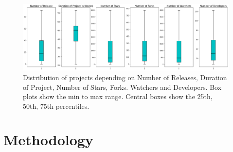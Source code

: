\documentclass[smallextended]{svjour3}
\begin{document}
\begin{figure}[!b]
\includegraphics[width=\linewidth]{meta_final3.png}
\caption{Distribution of projects depending on Number of Releases, Duration of Project, Number of Stars, Forks. Watchers and Developers.  Box plots show the min to max range. Central boxes show the 25th, 50th, 75th percentiles.}
\label{fig:data}
\end{figure}



\section{Methodology}
\label{sec:Methodology}
\end{document}
